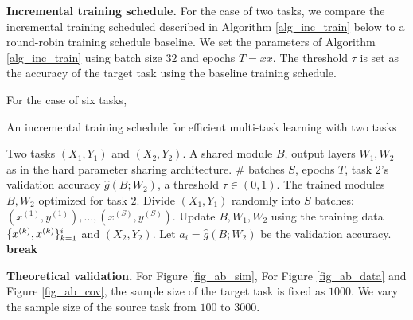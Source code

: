 \textbf{Incremental training schedule.}
For the case of two tasks, we compare the incremental training scheduled described in Algorithm \ref{alg_inc_train} below to a round-robin training schedule baseline.
We set the parameters of Algorithm \ref{alg_inc_train} using batch size $32$ and epochs $T = xx$.
The threshold $\tau$ is set as the accuracy of the target task using the baseline training schedule.

For the case of six tasks,

\begin{algorithm}[!h]
	\caption{An incremental training schedule for efficient multi-task learning with two tasks}
	\label{alg_inc_train}
	\begin{algorithmic}[1]
		\Input Two tasks $(X_1, Y_1)$ and $(X_2, Y_2)$.
		\Param A shared module $B$, output layers $W_1, W_2$ as in the hard parameter sharing architecture.
		\Req \# batches $S$, epochs $T$, task $2$'s validation accuracy $\hat{g}(B; W_2)$, a threshold $\tau\in(0,1)$.
		\Output The trained modules $B, W_2$ optimized for task $2$.
		\State Divide $(X_1, Y_1)$ randomly into $S$ batches: $(x^{(1)}, y^{(1)}), \dots, (x^{(S)}, y^{(S)})$.
				\State Update $B, W_1, W_2$ using the training data $\{x^{(k)}, x^{(k)}\}_{k=1}^i$ and  $(X_2, Y_2)$.
			\EndFor
			\State Let $a_i = \hat{g}(B; W_2)$ be the validation accuracy.
				\State \textbf{break}
			\EndIf
		\EndFor
	\end{algorithmic}
\end{algorithm}




\textbf{Theoretical validation.}
For Figure \ref{fig_ab_sim}, 
For Figure \ref{fig_ab_data} and Figure \ref{fig_ab_cov}, the sample size of the target task is fixed as $1000$.
We vary the sample size of the source task from $100$ to $3000$.




